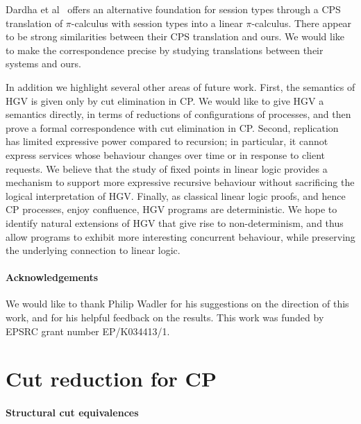 \documentclass{easychair}
\newcommand{\hgv}{HGV\xspace}
\begin{document}
Dardha et al~\cite{DardhaGS12} offers an alternative foundation for session types through a CPS
translation of $\pi$-calculus with session types into a linear $\pi$-calculus. There appear to be
strong similarities between their CPS translation and ours. We would like to make the correspondence
precise by studying translations between their systems and ours.

In addition we highlight several other areas of future work.  First, the semantics of \hgv is given
only by cut elimination in CP. We would like to give \hgv a semantics directly, in terms of
reductions of configurations of processes, and then prove a formal correspondence with cut
elimination in CP.  Second, replication has limited expressive power compared to recursion; in
particular, it cannot express services whose behaviour changes over time or in response to client
requests.  We believe that the study of fixed points in linear logic provides a mechanism to support
more expressive recursive behaviour without sacrificing the logical interpretation of \hgv.  Finally,
as classical linear logic proofs, and hence CP processes, enjoy confluence, \hgv programs are
deterministic. We hope to identify natural extensions of \hgv that give rise to non-determinism, and
thus allow programs to exhibit more interesting concurrent behaviour, while preserving the
underlying connection to linear logic.

\paragraph{Acknowledgements}
We would like to thank Philip Wadler for his suggestions on the direction of this work, and for his
helpful feedback on the results. This work was funded by EPSRC grant number EP/K034413/1.

\label{sect:bib}



\newpage
\appendix



\section{Cut reduction for CP}
\label{sect:cp-cut}

\paragraph{Structural cut equivalences}
\end{document}
